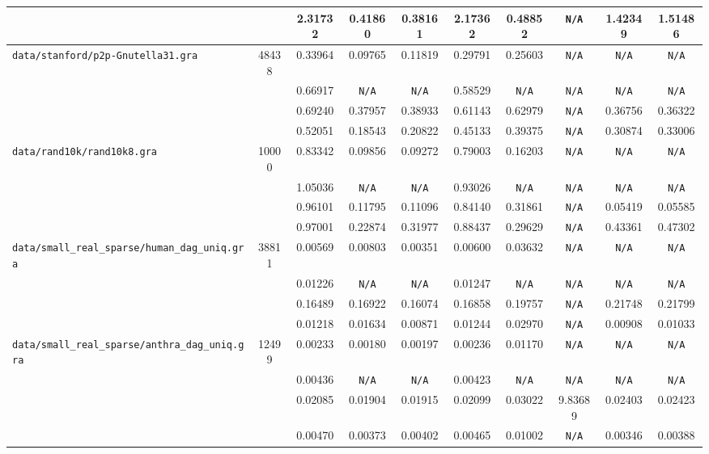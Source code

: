 \documentclass[12pt,a4paper,twoside]{article}
\begin{document}
{\begin{tabular}{ | l | c | c | c | c | c | c | c | c | c | }
\verb| | &  & 2.31732 & 0.41860 & 0.38161 & 2.17362 & 0.48852 & \verb|N/A| & 1.42349 & 1.51486 \\
\hline
\verb|data/stanford/p2p-Gnutella31.gra| & 48438 & 0.33964 & 0.09765 & 0.11819 & 0.29791 & 0.25603 & \verb|N/A| & \verb|N/A| & \verb|N/A| \\
\verb| | &  & 0.66917 & \verb|N/A| & \verb|N/A| & 0.58529 & \verb|N/A| & \verb|N/A| & \verb|N/A| & \verb|N/A| \\
\verb| | &  & 0.69240 & 0.37957 & 0.38933 & 0.61143 & 0.62979 & \verb|N/A| & 0.36756 & 0.36322 \\
\verb| | &  & 0.52051 & 0.18543 & 0.20822 & 0.45133 & 0.39375 & \verb|N/A| & 0.30874 & 0.33006 \\
\hline
\verb|data/rand10k/rand10k8.gra| & 10000 & 0.83342 & 0.09856 & 0.09272 & 0.79003 & 0.16203 & \verb|N/A| & \verb|N/A| & \verb|N/A| \\
\verb| | &  & 1.05036 & \verb|N/A| & \verb|N/A| & 0.93026 & \verb|N/A| & \verb|N/A| & \verb|N/A| & \verb|N/A| \\
\verb| | &  & 0.96101 & 0.11795 & 0.11096 & 0.84140 & 0.31861 & \verb|N/A| & 0.05419 & 0.05585 \\
\verb| | &  & 0.97001 & 0.22874 & 0.31977 & 0.88437 & 0.29629 & \verb|N/A| & 0.43361 & 0.47302 \\
\hline
\verb|data/small_real_sparse/human_dag_uniq.gra| & 38811 & 0.00569 & 0.00803 & 0.00351 & 0.00600 & 0.03632 & \verb|N/A| & \verb|N/A| & \verb|N/A| \\
\verb| | &  & 0.01226 & \verb|N/A| & \verb|N/A| & 0.01247 & \verb|N/A| & \verb|N/A| & \verb|N/A| & \verb|N/A| \\
\verb| | &  & 0.16489 & 0.16922 & 0.16074 & 0.16858 & 0.19757 & \verb|N/A| & 0.21748 & 0.21799 \\
\verb| | &  & 0.01218 & 0.01634 & 0.00871 & 0.01244 & 0.02970 & \verb|N/A| & 0.00908 & 0.01033 \\
\hline
\verb|data/small_real_sparse/anthra_dag_uniq.gra| & 12499 & 0.00233 & 0.00180 & 0.00197 & 0.00236 & 0.01170 & \verb|N/A| & \verb|N/A| & \verb|N/A| \\
\verb| | &  & 0.00436 & \verb|N/A| & \verb|N/A| & 0.00423 & \verb|N/A| & \verb|N/A| & \verb|N/A| & \verb|N/A| \\
\verb| | &  & 0.02085 & 0.01904 & 0.01915 & 0.02099 & 0.03022 & 9.83689 & 0.02403 & 0.02423 \\
\verb| | &  & 0.00470 & 0.00373 & 0.00402 & 0.00465 & 0.01002 & \verb|N/A| & 0.00346 & 0.00388 \\

\end{tabular}}
\end{document}
